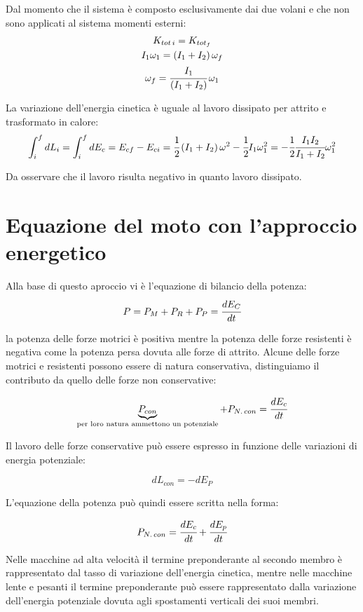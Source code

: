 \begin{enumerate}
	Dal momento che il sistema è composto esclusivamente dai due volani e che non sono applicati al sistema momenti esterni:
	\begin{gather*}
		K_{tot\,i} = K_{tot_f}\\
		I_1\omega_1 = (I_1 + I_2)\,\omega_f\\
		\omega_f = \cfrac{I_1}{(I_1 + I_2)}\,\omega_1 
	\end{gather*}
	
	La variazione dell'energia cinetica è uguale al lavoro dissipato per attrito e trasformato in calore:
	\[ \int_i^f dL_i = \int_i^f dE_c = E_{cf} - E_{ci} = \cfrac{1}{2}\,(I_1 + I_2)\,\omega^2 - \cfrac{1}{2}I_1\omega_1^2 = -\cfrac{1}{2} \cfrac{I_1I_2}{I_1 + I_2} \omega_1^2\]
	
	Da osservare che il lavoro risulta negativo in quanto lavoro dissipato.
	\end{enumerate}
	
	\section{Equazione del moto con l'approccio energetico}
	
		Alla base di questo aproccio vi è l'equazione di bilancio della potenza:
		\[
			P = P_M + P_R + P_P = \cfrac{dE_C}{dt}
		\]
		
		la potenza delle forze motrici è positiva mentre la potenza delle forze resistenti è negativa come la potenza persa dovuta alle forze di attrito. Alcune delle forze motrici e resistenti possono essere di natura conservativa, distinguiamo il contributo da quello delle forze non conservative:
		
		\[\underbrace{P_{con}}_{\text{per loro natura ammettono un potenziale}} + P_{N.\,con} = \cfrac{dE_c}{dt}\]
		
		Il lavoro delle forze conservative può essere espresso in funzione delle variazioni di energia potenziale:
		
		\[dL_{con} = -dE_P\]		
		
		L'equazione della potenza può quindi essere scritta nella forma:
		
		\[P_{N.\,con} = \cfrac{dE_c}{dt} + \cfrac{dE_p}{dt}\]
		
		Nelle macchine ad alta velocità il termine preponderante al secondo membro è rappresentato dal tasso di variazione dell'energia cinetica, mentre nelle macchine lente e pesanti il termine preponderante può essere rappresentato dalla variazione dell'energia potenziale dovuta agli spostamenti verticali dei suoi membri.
		
